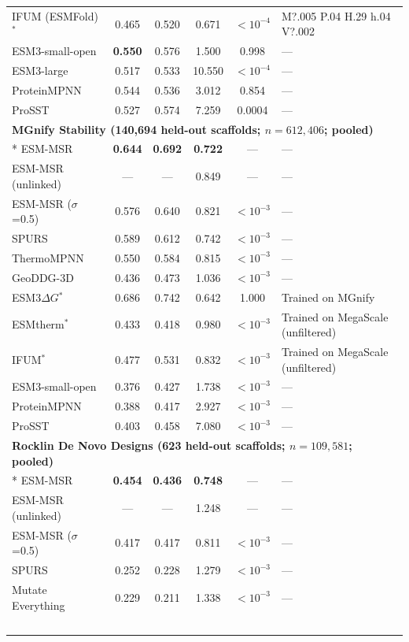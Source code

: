{\begin{longtable}{lccccl}
IFUM (ESMFold)$^*$ & 0.465 & 0.520 & 0.671 & $<10^{-4}$ & M?.005 P.04 H.29 h.04 V?.002 \\
ESM3-small-open & \textbf{0.550} & 0.576 & 1.500 & 0.998 & --- \\
ESM3-large & 0.517 & 0.533 & 10.550 & $<10^{-4}$ & --- \\
ProteinMPNN & 0.544 & 0.536 & 3.012 & 0.854 & --- \\
ProSST & 0.527 & 0.574 & 7.259 & 0.0004 & --- \\
\midrule
\multicolumn{6}{l}{\textbf{MGnify Stability (140,694 held-out scaffolds; $n=612{,}406$; pooled)}} \\*
\midrule
ESM-MSR & \textbf{0.644} & \textbf{0.692} & \textbf{0.722} & --- & --- \\
ESM-MSR (unlinked) & --- & --- & 0.849 & --- & --- \\
ESM-MSR ($\sigma$=0.5) & 0.576 & 0.640 & 0.821 & $<10^{-3}$ & --- \\
SPURS & 0.589 & 0.612 & 0.742 & $<10^{-3}$ & --- \\
ThermoMPNN & 0.550 & 0.584 & 0.815 & $<10^{-3}$ & --- \\
GeoDDG-3D & 0.436 & 0.473 & 1.036 & $<10^{-3}$ & --- \\
ESM3$\Delta G$$^*$ & 0.686 & 0.742 & 0.642 & 1.000 & Trained on MGnify \\
ESMtherm$^*$ & 0.433 & 0.418 & 0.980 & $<10^{-3}$ & Trained on MegaScale (unfiltered) \\
IFUM$^*$ & 0.477 & 0.531 & 0.832 & $<10^{-3}$ & Trained on MegaScale (unfiltered) \\
ESM3-small-open & 0.376 & 0.427 & 1.738 & $<10^{-3}$ & --- \\
ProteinMPNN & 0.388 & 0.417 & 2.927 & $<10^{-3}$ & --- \\
ProSST & 0.403 & 0.458 & 7.080 & $<10^{-3}$ & --- \\
\midrule
\multicolumn{6}{l}{\textbf{Rocklin De Novo Designs (623 held-out scaffolds; $n=109{,}581$; pooled)}} \\*
\midrule
ESM-MSR & \textbf{0.454} & \textbf{0.436} & \textbf{0.748} & --- & --- \\
ESM-MSR (unlinked) & --- & --- & 1.248 & --- & --- \\
ESM-MSR ($\sigma$=0.5) & 0.417 & 0.417 & 0.811 & $<10^{-3}$ & --- \\
SPURS & 0.252 & 0.228 & 1.279 & $<10^{-3}$ & --- \\
Mutate Everything & 0.229 & 0.211 & 1.338 & $<10^{-3}$ & --- \\
$$
\end{longtable}}

